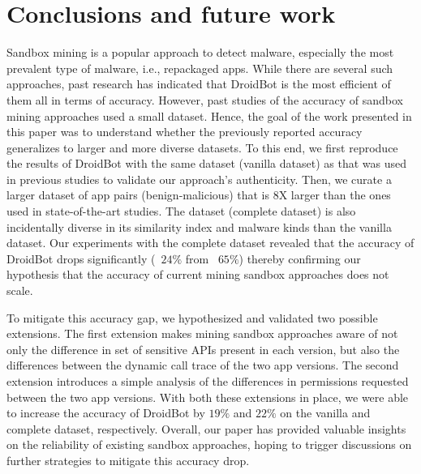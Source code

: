 \section{Conclusions and future work}\label{sec:conclusions}


Sandbox mining is a popular approach to detect malware, especially the most prevalent type of malware, i.e., repackaged apps. While there are several such approaches, past research has indicated that DroidBot is the most efficient of them all in terms of accuracy. However, past studies of the accuracy of sandbox mining approaches used a small dataset. 
Hence, the goal of the work presented in this paper was to understand whether the previously reported accuracy generalizes to larger and more diverse datasets. To this end, we first reproduce the results of DroidBot with the same dataset (vanilla dataset) as that was used in previous studies to validate our approach's authenticity. Then, we curate a larger dataset of app pairs (benign-malicious) that is 8X larger than the ones used in state-of-the-art studies. The dataset (complete dataset) is also incidentally diverse in its similarity index and malware kinds than the vanilla dataset. Our experiments with the complete dataset revealed that the accuracy of DroidBot drops significantly (~$24\%$ from ~$65\%$) thereby confirming our hypothesis that the accuracy of current mining sandbox approaches does not scale.
      
To mitigate this accuracy gap, we hypothesized and validated two possible extensions. The first extension makes mining sandbox approaches aware of not only the difference in set of sensitive APIs present in each version, but also the differences between the dynamic call trace of the two app versions. The second extension introduces a simple analysis of the differences in permissions requested between the two app versions. With both these extensions in place, we were able to increase the accuracy of DroidBot by $19\%$ and $22\%$ on the vanilla and complete dataset, respectively. 
Overall, our paper has provided valuable insights on the reliability of existing sandbox approaches, hoping to trigger discussions on further strategies to mitigate this accuracy drop. 

